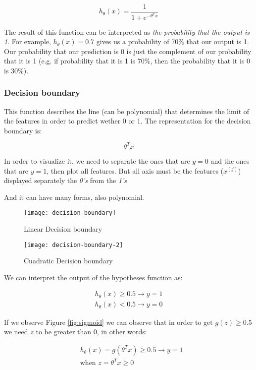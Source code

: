 $$h_{\theta}(x) = \frac{1}{1 + e^{-\theta^Tx}}$$

The result of this function can be interpreted as \textit{the probability that the output is 1}. For example, $h_{\theta}(x)=0.7$ gives us a probability of 70\% that our output is 1. Our probability that our prediction is 0 is just the complement of our probability that it is 1 (e.g. if probability that it is 1 is 70\%, then the probability that it is 0 is 30\%).


\subsubsection{Decision boundary}
This function describes the line (can be polynomial) that determines the limit of the features in order to predict wether 0 or 1. The representation for the decision boundary is:

$$\theta^Tx$$


\noindent In order to visualize it, we need to separate the ones that are $y = 0$ and the ones that are $y = 1$, then plot all features. But all axis must be the features ($x^{(j)}$) displayed separately the \textit{0's} from the \textit{1's}


\noindent And it can have many forms, also polynomial.


\begin{figure}[h]
	\begin{multicols}{2}
	\centering
	\texttt{[image: decision-boundary]}
	\caption{Linear Decision boundary}
	\label{fig:decision-boundary}

	\centering
	\texttt{[image: decision-boundary-2]}
	\caption{Cuadratic Decision boundary}
	\label{fig:decision-boundary-2}
	\end{multicols}
\end{figure}



\noindent We can interpret the output of the hypotheses function as:

\begin{align*}
	h_{\theta}(x) \ge 0.5 \to  y = 1 \\
	h_{\theta}(x) < 0.5 \to  y = 0
\end{align*}

\noindent If we observe Figure \ref{fig:sigmoid} we can observe that in order to get $g(z) \ge 0.5$ we need $z$ to be greater than $0$, in other words:

\begin{align*}
	& h_{\theta}(x) = g(\theta^Tx) \ge 0.5 \to  y = 1 \\
	& \text{when } z = \theta^Tx \ge 0
\end{align*}

